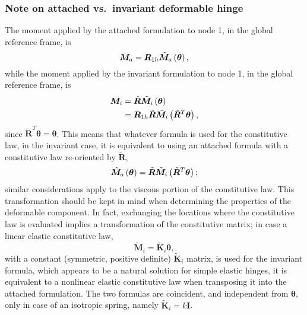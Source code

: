 \documentclass[10pt,fleqn,subeqn]{report}
\newcommand{\T}[1]{\bm{#1}}
\begin{document}
\subsubsection{Note on attached vs.\ invariant deformable hinge}
The moment applied by the attached formulation to node 1,
in the global reference frame, is
\begin{equation}
	\T{M}_a = \T{R}_{1h} \tilde{\T{M}}_a\plbr{\T{\theta}} ,
\end{equation}
while the moment applied by the invariant formulation to node 1,
in the global reference frame, is
\begin{align}
	\T{M}_i
	&= \hat{\T{R}} \tilde{\T{M}}_i\plbr{\T{\theta}} \nonumber \\
	&= \T{R}_{1h} \tilde{\T{R}} \tilde{\T{M}}_i\plbr{\tilde{\T{R}}^T \T{\theta}} ,
\end{align}
since $\tilde{\T{R}}^T \T{\theta}=\T{\theta}$.
This means that whatever formula is used for the constitutive law,
in the invariant case, it is equivalent to using an attached formula 
with a constitutive law re-oriented by $\tilde{\T{R}}$,
\begin{equation}
	\tilde{\T{M}}_a\plbr{\T{\theta}}
		= \tilde{\T{R}} \tilde{\T{M}}_i\plbr{\tilde{\T{R}}^T \T{\theta}} ;
\end{equation}
similar considerations apply to the viscous portion of the constitutive law.
This transformation should be kept in mind when determining the properties
of the deformable component.
In fact, exchanging the locations where the constitutive law is evaluated
implies a transformation of the constitutive matrix; in case a linear elastic
constitutive law,
\begin{equation}
	\tilde{\T{M}}_i = \tilde{\T{K}}_i \T{\theta} ,
\end{equation}
with a constant (symmetric, positive definite) $\tilde{\T{K}}_i$ matrix,
is used for the invariant formula, which appears to be a natural solution 
for simple elastic hinges, it is equivalent to a nonlinear elastic 
constitutive law when transposing it into the attached formulation.
The two formulas are coincident, and independent from $\T{\theta}$,
only in case of an isotropic spring, namely $\tilde{\T{K}}_i=k\T{I}$.
\end{document}
